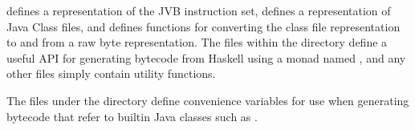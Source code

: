 \documentclass[dissertation.tex]{subfiles}
\begin{document}
{{\begin{minipage}{0.7\textwidth}

         defines a representation of the JVB instruction set,  defines a
        representation of Java Class files, and  defines functions for converting the class file
        representation to and from a raw byte representation. The files within the  directory define
        a useful API for generating bytecode from Haskell using a monad named , and any other files
        simply contain utility functions.

        The files under the  directory define convenience variables for use when generating bytecode
        that refer to builtin Java classes such as .
        \end{minipage}
        \hspace{5mm}
        \begin{minipage}{0.2\textwidth}
        \vspace{-2cm}
        \footnotesize
        \end{minipage}
    }
}
\end{document}
